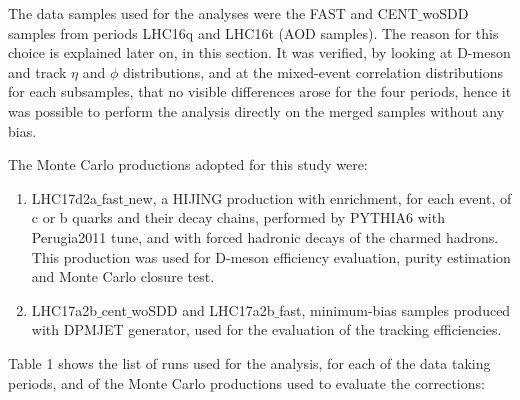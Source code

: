 The data samples used for the analyses were the FAST and CENT$\_$woSDD samples from periods LHC16q and LHC16t (AOD samples). The reason for this choice is explained later on, in this section. It was verified, by looking at D-meson and track $\eta$ and $\phi$ distributions, and at the mixed-event correlation distributions for each subsamples, that no visible differences arose for the four periods, hence it was possible to perform the analysis directly on the merged samples without any bias.

The Monte Carlo productions adopted for this study were:
 \begin{enumerate}
 \item LHC17d2a$\_$fast$\_$new, a HIJING production with enrichment, for each event, of c or b quarks and their decay chains, performed by PYTHIA6 with Perugia2011 tune, and with forced hadronic decays of the charmed hadrons. This production was used for D-meson efficiency evaluation, purity estimation and Monte Carlo closure test.
 \item LHC17a2b$\_$cent$\_$woSDD and LHC17a2b$\_$fast, minimum-bias samples produced with DPMJET generator, used for the evaluation of the tracking efficiencies.
\end{enumerate}

Table 1 shows the list of runs used for the analysis, for each of the data taking periods, and of the Monte Carlo productions used to evaluate the corrections:

